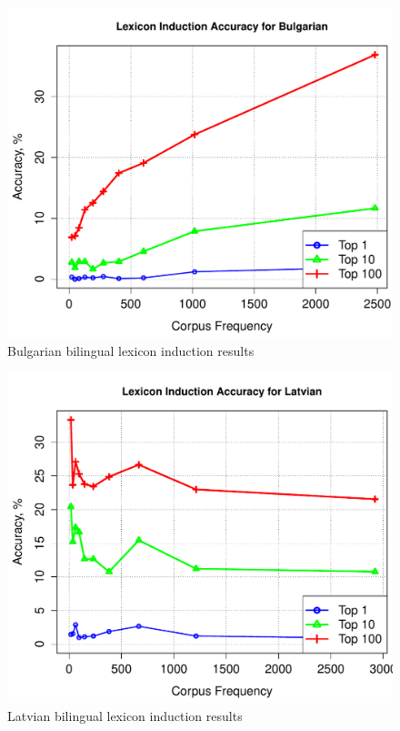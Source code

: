 \documentclass[11pt]{article}
\begin{document}
\begin{figure}
\begin{center}
\includegraphics[width=0.9 \linewidth]{../byFreqGraphs/bg/lexinductnew.pdf}
\vskip -0.15in
\caption{Bulgarian bilingual lexicon induction results}
\label{fig:bli.bg} 
\end{center}
\end{figure}

\begin{figure}
\begin{center}
\includegraphics[width=0.9 \linewidth]{../byFreqGraphs/lv/lexinductnew.pdf}
\vskip -0.15in
\caption{Latvian bilingual lexicon induction results}
\label{fig:bli.lv} 
\end{center}
\end{figure}
\end{document}
